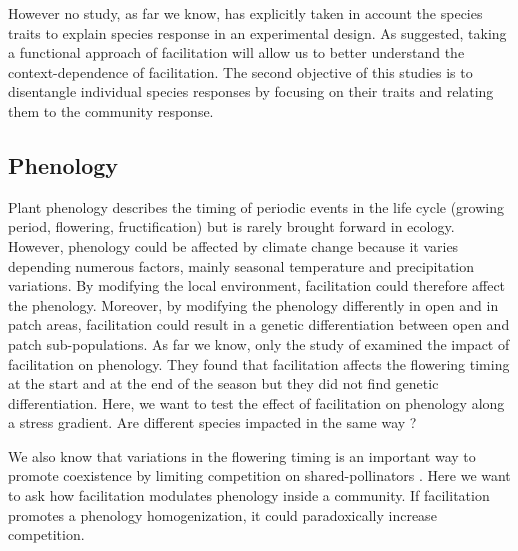 \documentclass[12pt, a4paper]{article} %
\begin{document}
However no study, as far we know, has explicitly taken in account the species traits to explain species response in an experimental design. As \citet{Butterfield2013} suggested, taking a functional approach of facilitation will allow us to better understand the context-dependence of facilitation. The second objective of this studies is to disentangle individual species responses by focusing on their traits and relating them to the community response. 

\subsection{Phenology}
Plant phenology describes the timing of periodic events in the life cycle (growing period, flowering, fructification) but is rarely brought forward in ecology.
However, phenology could be affected by climate change \citep{Cleland2007} because it varies depending numerous factors, mainly seasonal temperature and precipitation variations. By modifying the local environment, facilitation could therefore affect the phenology. Moreover, by modifying the phenology differently in open and in patch areas, facilitation could result in a genetic differentiation between open and patch sub-populations. As far we know, only the study of \citet{Castellanos2014} examined the impact of facilitation on phenology. They found that facilitation affects the flowering timing at the start and at the end of the season but they did not find genetic differentiation. Here, we want to test the effect of facilitation on phenology along a stress gradient. Are different species impacted in the same way ?

We also know that variations in the flowering timing is an important way to promote coexistence by limiting competition on shared-pollinators \citep{Cleland2006}. Here we want to ask how facilitation modulates phenology inside a community. If facilitation promotes a phenology homogenization, it could paradoxically increase competition. 
\end{document}
